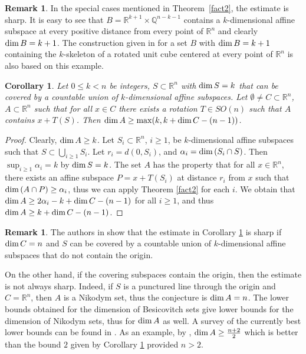 \documentclass[a4paper]{amsart}
\newtheorem{cor}[theorem]{Corollary}
\theoremstyle{definition} \newtheorem{remark}[theorem]{Remark}
\def\rr{{\mathbb R}}
\def\R{{\mathbb R}}
\def\Q{{\mathbb Q}}
\def\su{\subset}
\def\al{\alpha}
\def\dim{{\rm dim}\, }
\begin{document}
\begin{remark}
In the special cases mentioned in Theorem~\ref{fact2}, the estimate is sharp. It is easy to see that
$B=\R^{k+1}\times \Q^{n-k-1}$ contains a $k$-dimensional affine subspace 
at every positive distance from every point of $\R^n$ and clearly $\dim B=k+1$. 
The construction given in \cite{CCHK} for a set $B$ with $\dim B =k+1$ containing the $k$-skeleton
of a rotated unit cube centered at every point of $\R^n$ is also based on this example.  
\end{remark}

\begin{cor}
\label{ffact2}
Let $0 \leq k < n$ be integers, $S \su \R^n$ with $\dim S=k$ that can be covered by a countable union
of $k$-dimensional affine subspaces. Let $\emptyset \neq C \su \R^n$, $A \su \R^n$ such that 
for all $x \in C$ there exists a rotation $T \in SO(n)$ such that $A$ contains $x + T(S)$. 
Then $\dim A \geq \max(k, k+ \dim C - (n-1))$. 
%
\end{cor}

\begin{proof}
Clearly, $\dim A \geq k$. Let $S_i \su \rr^n$, $i \geq 1$, be $k$-dimensional affine subspaces such that $S \su \bigcup_{i \geq 1} S_i$. 
Let $r_i=d(0,S_i)$, and
$\al_i=\dim (S_i \cap S)$. Then $\sup_{i \geq 1} \al_i =k$ by $\dim S=k$. The set $A$ has the property that for all $x \in \rr^n$, 
there exists an affine subspace $P=x+T(S_i)$ at distance $r_i$ from $x$ such that $\dim (A \cap P) \geq \al_i$, thus we can apply 
Theorem \ref{fact2} for each $i$. 
We obtain that $\dim A \geq 2\al_i-k + \dim C - (n-1)$ for all $i\geq 1$, and thus $\dim A \geq k + \dim C - (n-1)$. 
\end{proof}

\begin{remark}
The authors in \cite{CCHK} show that the estimate in Corollary \ref{ffact2} is sharp 
if $\dim C=n$ and $S$ can be covered by a countable union
of $k$-dimensional affine subspaces that do not contain the origin. 

On the other hand, if the covering subspaces contain the origin, then the estimate is not always sharp. 
Indeed, if $S$ is a punctured line through the origin and $C=\rr^n$, 
then $A$ is a Nikodym set, thus the conjecture is $\dim A = n$. 
The lower bounds obtained for the dimension of Besicovitch sets give lower bounds for the dimension of Nikodym sets, thus for $\dim A$ as well. 
A survey of the currently best lower bounds can be found in \cite{Ma15}. 
As an example, by \cite{Wo}, $\dim A \geq \frac{n+2}{2}$ which is better than the bound $2$ given by Corollary \ref{ffact2} provided $n >2$. 
\end{remark}
\end{document}
